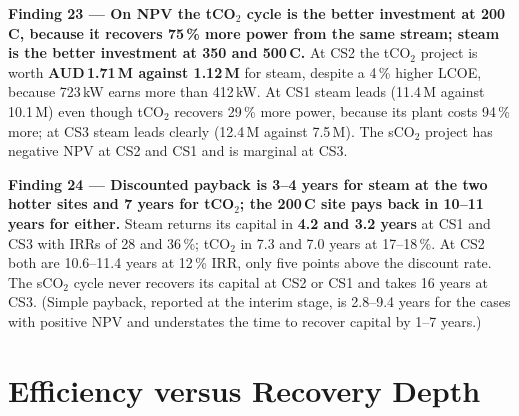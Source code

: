 \documentclass[12pt,a4paper]{report}
\newcommand{\keyresult}[1]{\textbf{\color{resultgreen}#1}}
\begin{document}
\begin{findingbox}
\textbf{Finding 23 --- On NPV the tCO$_2$ cycle is the better investment at
200\,\textdegree C, because it recovers 75\,\% more power from the same
stream; steam is the better investment at 350 and 500\,\textdegree C.}
At CS2 the tCO$_2$ project is worth \keyresult{AUD\,1.71\,M against 1.12\,M}
for steam, despite a 4\,\% higher LCOE, because 723\,kW earns more than
412\,kW. At CS1 steam leads (11.4\,M against 10.1\,M) even though tCO$_2$
recovers 29\,\% more power, because its plant costs 94\,\% more; at CS3
steam leads clearly (12.4\,M against 7.5\,M). The sCO$_2$ project has
negative NPV at CS2 and CS1 and is marginal at CS3.
\end{findingbox}

\begin{findingbox}
\textbf{Finding 24 --- Discounted payback is 3--4 years for steam at the two
hotter sites and 7 years for tCO$_2$; the 200\,\textdegree C site pays back
in 10--11 years for either.}
Steam returns its capital in \keyresult{4.2 and 3.2 years} at CS1 and CS3
with IRRs of 28 and 36\,\%; tCO$_2$ in 7.3 and 7.0 years at 17--18\,\%. At
CS2 both are 10.6--11.4 years at 12\,\% IRR, only five points above the
discount rate. The sCO$_2$ cycle never recovers its capital at CS2 or CS1 and
takes 16 years at CS3. (Simple payback, reported at the interim stage, is
2.8--9.4 years for the cases with positive NPV and understates the time to
recover capital by 1--7 years.)
\end{findingbox}

\section{Efficiency versus Recovery Depth}
\label{sec:rq3_recovery}
\end{document}
